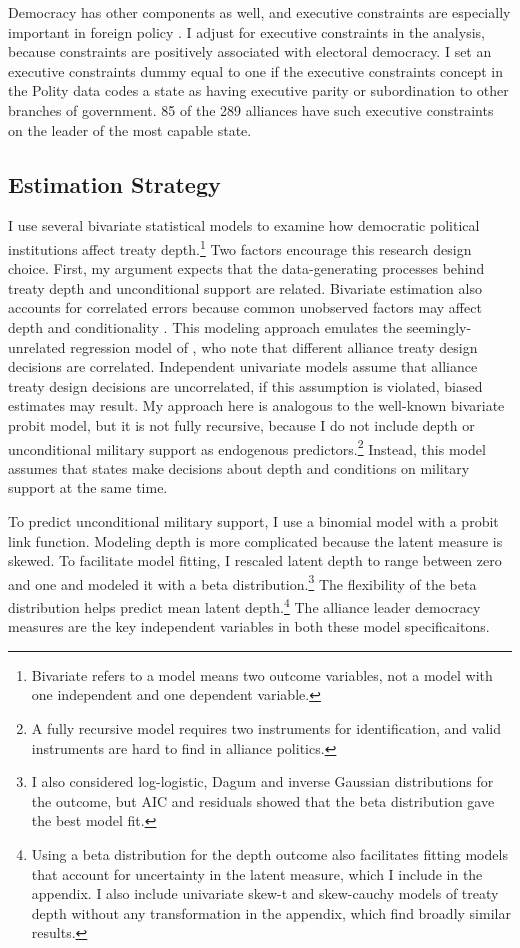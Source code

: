 \documentclass[12pt]{article}
\begin{document}
Democracy has other components as well, and executive constraints are especially important in foreign policy \citep{MilnerTingley2015}. 
I adjust for executive constraints in the analysis, because constraints are positively associated with electoral democracy.
I set an executive constraints dummy equal to one if the executive constraints concept in the Polity data codes a state as having executive parity or subordination to other branches of government.
85 of the 289 alliances have such executive constraints on the leader of the most capable state.



\subsection{Estimation Strategy}



I use several bivariate statistical models to examine how democratic political institutions affect treaty depth.\footnote{Bivariate refers to a model means two outcome variables, not a model with one independent and one dependent variable.} 
Two factors encourage this research design choice. 
First, my argument expects that the data-generating processes behind treaty depth and unconditional support are related. 
Bivariate estimation also accounts for correlated errors because common unobserved factors may affect depth and conditionality \citep{Braumoelleretal2018}.
This modeling approach emulates the seemingly-unrelated regression model of \citet{FjelstulReiter2019}, who note that different alliance treaty design decisions are correlated. 
Independent univariate models assume that alliance treaty design decisions are uncorrelated, if this assumption is violated, biased estimates may result. 
My approach here is analogous to the well-known bivariate probit model, but it is not fully recursive, because I do not include depth or unconditional military support as endogenous predictors.\footnote{A fully recursive model requires two instruments for identification, and valid instruments are hard to find in alliance politics.}  
Instead, this model assumes that states make decisions about depth and conditions on military support at the same time. 


To predict unconditional military support, I use a binomial model with a probit link function. 
Modeling depth is more complicated because the latent measure is skewed.
To facilitate model fitting, I rescaled latent depth to range between zero and one and modeled it with a beta distribution.\footnote{I also considered log-logistic, Dagum and inverse Gaussian distributions for the outcome, but AIC and residuals showed that the beta distribution gave the best model fit.}
The flexibility of the beta distribution helps predict mean latent depth.\footnote{Using a beta distribution for the depth outcome also facilitates fitting models that account for uncertainty in the latent measure, which I include in the appendix. I also include univariate skew-t and skew-cauchy models of treaty depth without any transformation in the appendix, which find broadly similar results.} 
The alliance leader democracy measures are the key independent variables in both these model specificaitons. 
\end{document}

